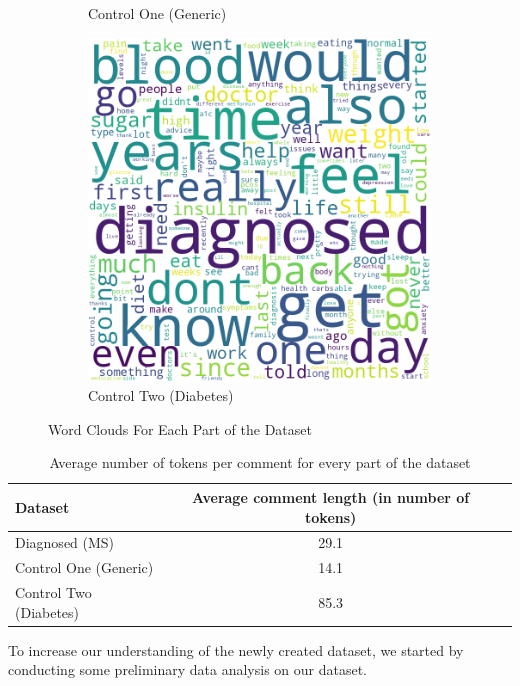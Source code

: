 \documentclass[11pt,a4paper]{article}
\begin{document}
\begin{figure}[h!]
\begin{subfigure}[b]{0.3\linewidth}
    \caption{Control One (Generic)}
  \end{subfigure}
  \hspace{0.5em}
  \begin{subfigure}[b]{0.3\linewidth}
    \includegraphics[width=\linewidth]{controltwofinal.png}
    \caption{Control Two (Diabetes)}
  \end{subfigure}
  \caption{Word Clouds For Each Part of the Dataset}
  \label{fig:wordclouds}
\end{figure}
\begin{table}
\centering
\begin{tabular}{lcc}
\hline
\textbf{Dataset} & \textbf{\hspace{1.5cm}Average comment length (in number of tokens)\hspace{1.1cm}} & \hspace{1cm}\\
\hline
Diagnosed (MS) & 29.1 & \\
Control One (Generic) & 14.1 & \\
Control Two (Diabetes) & 85.3  & \\ 
\hline
\end{tabular}
\caption{Average number of tokens per comment for every part of the dataset}
\label{tab:avglengths}
\end{table}
To increase our understanding of the newly created dataset, we started by conducting some preliminary data analysis on our dataset. \\
\end{document}
